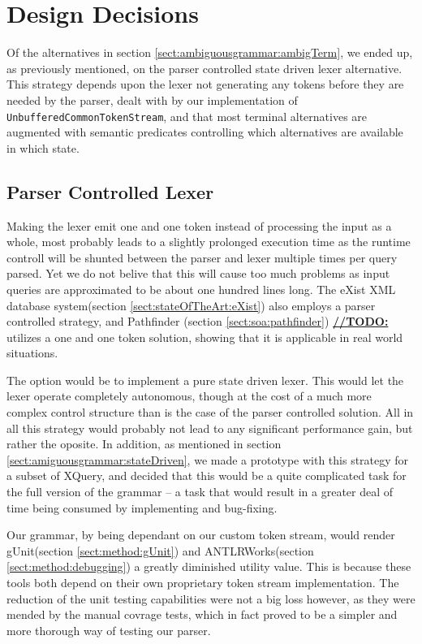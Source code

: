 \section{Design Decisions}
\label{sect:discussion:designDecisions}

Of the alternatives in section \ref{sect:ambiguousgrammar:ambigTerm}, we ended up, as previously mentioned, on the parser controlled state driven lexer alternative. This strategy depends upon the lexer not generating any tokens before they are needed by the parser, dealt with by our implementation of \verb!UnbufferedCommonTokenStream!, and that most terminal alternatives are augmented with semantic predicates controlling which alternatives are available in which state.

\subsection{Parser Controlled Lexer}
Making the lexer emit one and one token instead of processing the input as a whole, most probably leads to a slightly prolonged execution time as the runtime controll will be shunted between the parser and lexer multiple times per query parsed. Yet we do not belive that this will cause too much problems as input queries are approximated to be about one hundred lines long. The eXist XML database system(section \ref{sect:stateOfTheArt:eXist}) also employs a parser controlled strategy, and Pathfinder (section \ref{sect:soa:pathfinder}) \underline{\textbf{\LARGE //TODO:}} utilizes a one and one token solution, showing that it is applicable in real world situations.

The option would be to implement a pure state driven lexer. This would let the lexer operate completely autonomous, though at the cost of a much more complex control structure than is the case of the parser controlled solution. All in all this strategy would probably not lead to any significant performance gain, but rather the oposite. In addition, as mentioned in section \ref{sect:amiguousgrammar:stateDriven}, we made a prototype with this strategy for a subset of XQuery, and decided that this would be a quite complicated task for the full version of the grammar -- a task that would result in a greater deal of time being consumed by implementing and bug-fixing.

Our grammar, by being dependant on our custom token stream, would render gUnit(section \ref{sect:method:gUnit}) and ANTLRWorks(section \ref{sect:method:debugging}) a greatly diminished utility value. This is because these tools both depend on their own proprietary token stream implementation. The reduction of the unit testing capabilities were not a big loss however, as they were mended by the manual covrage tests, which in fact proved to be a simpler and more thorough way of testing our parser. 

